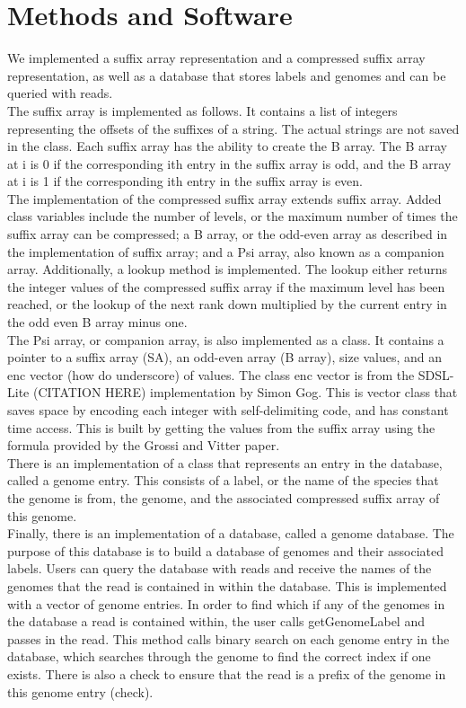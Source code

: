 \documentclass{article}
\begin{document}
\section{Methods and Software}
We implemented a suffix array representation and a compressed suffix array representation, as well as a database that stores labels and genomes and can be queried with reads.\\
\indent The suffix array is implemented as follows. It contains a list of integers representing the offsets of the suffixes of a string. The actual strings are not saved in the class. Each suffix array has the ability to create the B array. The B array at i is 0 if the corresponding ith entry in the suffix array is odd, and the B array at i is 1 if the corresponding ith entry in the suffix array is even.\\
\indent The implementation of the compressed suffix array extends suffix array. Added class variables include the number of levels, or the maximum number of times the suffix array can be compressed; a B array, or the odd-even array as described in the implementation of suffix array; and a Psi array, also known as a companion array. Additionally, a lookup method is implemented. The lookup either returns the integer values of the compressed suffix array if the maximum level has been reached, or the lookup of the next rank down multiplied by the current entry in the odd even B array minus one.\\
\indent The Psi array, or companion array, is also implemented as a class. It contains a pointer to a suffix array (SA), an odd-even array (B array), size values, and an enc vector (how do underscore) of values. The class enc vector is from the SDSL-Lite (CITATION HERE) implementation by Simon Gog. This is vector class that saves space by encoding each integer with self-delimiting code, and has constant time access. This is built by getting the values from the suffix array using the formula provided by the Grossi and Vitter paper.\\
\indent There is an implementation of a class that represents an entry in the database, called a genome entry. This consists of a label, or the name of the species that the genome is from, the genome, and the associated compressed suffix array of this genome.\\
\indent Finally, there is an implementation of a database, called a genome database. The purpose of this database is to build a database of genomes and their associated labels. Users can query the database with reads and receive the names of the genomes that the read is contained in within the database. This is implemented with a vector of genome entries. In order to find which if any of the genomes in the database a read is contained within, the user calls getGenomeLabel and passes in the read. This method calls binary search on each genome entry in the database, which searches through the genome to find the correct index if one exists. There is also a check to ensure that the read is a prefix of the genome in this genome entry (check).\\
\end{document}
